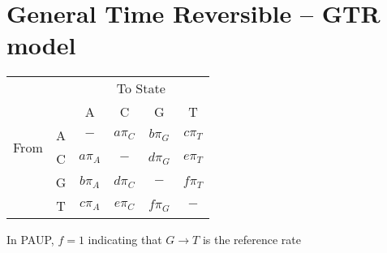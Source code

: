 \documentclass[landscape]{foils}
\begin{document}
\myNewSlide
 

\myNewSlide
\section*{General Time Reversible -- GTR model}
\begin{table}[htdp]
\begin{center}
\begin{tabular}{cc|cccc}
& & \multicolumn{4}{c}{To State} \\
& & A & C & G & T \\
\hline
\multirow{2}{*}{From } & A &  $-$ & $a\pi_C $ & $b\pi_G$ & $c\pi_T $    \\
\multirow{2}{*}{State } &C & $a\pi_A$ & $- $ & $d\pi_G$ & $e\pi_T $    \\
 & G & $b\pi_A$ & $d\pi_C $ & $-$ & $f\pi_T $    \\
 &  T & $c\pi_A$ & $e\pi_C $ & $f\pi_G$ & $- $    \\
\end{tabular}
\end{center}
\end{table}
In PAUP, $f=1$ indicating that $G\rightarrow T$ is the reference rate


\myNewSlide



\end{document}

